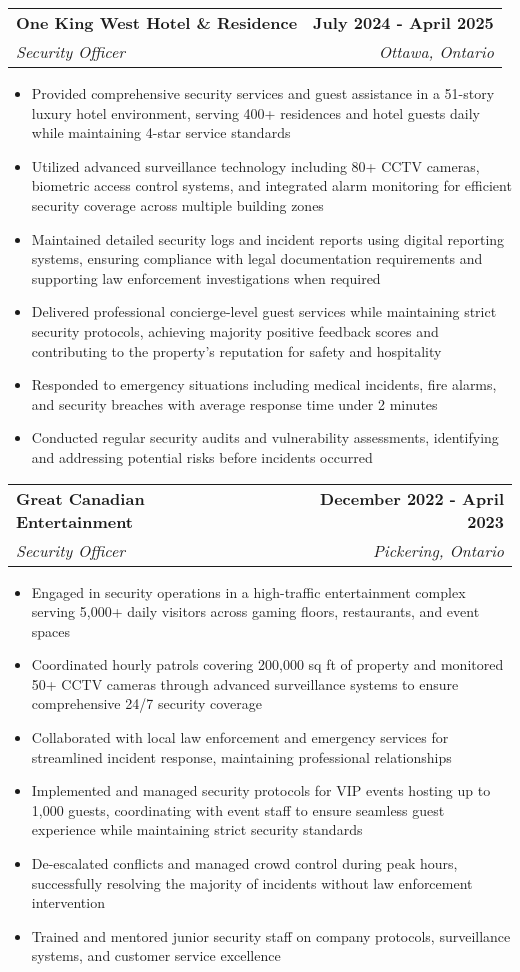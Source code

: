 \documentclass[letterpaper,11pt]{article}
\makeatletter
\newcommand{\resumeItem}[1]{
  \item\small{
    {#1 \vspace{-2pt}}
  }
}
\newcommand{\resumeSubheading}[4]{
  \vspace{-2pt}\item
    \begin{tabular*}{1.0\textwidth}[t]{l@{\extracolsep{\fill}}r}
      \textbf{#1} & \textbf{\small #2} \\
      \textit{\small#3} & \textit{\small #4} \\
    \end{tabular*}\vspace{-7pt}
}
\newcommand{\resumeItemListStart}{\begin{itemize}}
\newcommand{\resumeItemListEnd}{\end{itemize}\vspace{-5pt}}
\makeatother
\begin{document}
    \resumeSubheading
      {One King West Hotel \& Residence}{July 2024 - April 2025}
      {Security Officer}{Ottawa, Ontario}
      \resumeItemListStart
        \resumeItem{Provided comprehensive security services and guest assistance in a 51-story luxury hotel environment, serving 400+ residences and hotel guests daily while maintaining 4-star service standards}
        \resumeItem{Utilized advanced surveillance technology including 80+ CCTV cameras, biometric access control systems, and integrated alarm monitoring for efficient security coverage across multiple building zones}
        \resumeItem{Maintained detailed security logs and incident reports using digital reporting systems, ensuring compliance with legal documentation requirements and supporting law enforcement investigations when required}
        \resumeItem{Delivered professional concierge-level guest services while maintaining strict security protocols, achieving majority positive feedback scores and contributing to the property's reputation for safety and hospitality}
        \resumeItem{Responded to emergency situations including medical incidents, fire alarms, and security breaches with average response time under 2 minutes}
        \resumeItem{Conducted regular security audits and vulnerability assessments, identifying and addressing potential risks before incidents occurred}
    \resumeItemListEnd

    \resumeSubheading
      {Great Canadian Entertainment}{December 2022 - April 2023}
      {Security Officer}{Pickering, Ontario}
      \resumeItemListStart
        \resumeItem{Engaged in security operations in a high-traffic entertainment complex serving 5,000+ daily visitors across gaming floors, restaurants, and event spaces}
        \resumeItem{Coordinated hourly patrols covering 200,000 sq ft of property and monitored 50+ CCTV cameras through advanced surveillance systems to ensure comprehensive 24/7 security coverage}
        \resumeItem{Collaborated with local law enforcement and emergency services for streamlined incident response, maintaining professional relationships}
        \resumeItem{Implemented and managed security protocols for VIP events hosting up to 1,000 guests, coordinating with event staff to ensure seamless guest experience while maintaining strict security standards}
        \resumeItem{De-escalated conflicts and managed crowd control during peak hours, successfully resolving the majority of incidents without law enforcement intervention}
        \resumeItem{Trained and mentored junior security staff on company protocols, surveillance systems, and customer service excellence}
      \resumeItemListEnd
\end{document}
